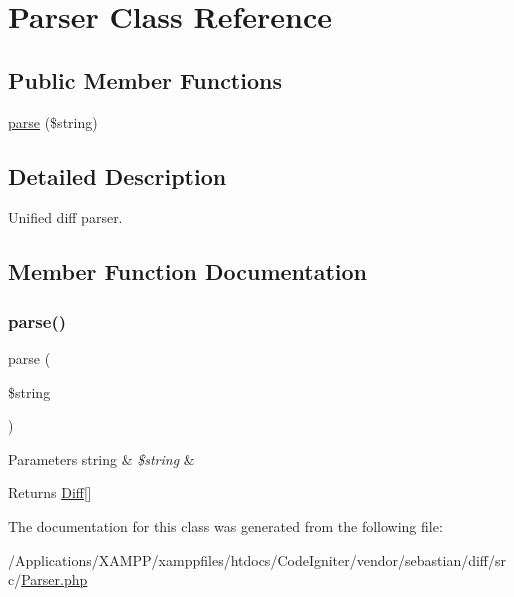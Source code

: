 \hypertarget{class_sebastian_bergmann_1_1_diff_1_1_parser}{}\section{Parser Class Reference}
\label{class_sebastian_bergmann_1_1_diff_1_1_parser}
\subsection*{Public Member Functions}
\begin{DoxyCompactItemize}
\item 
\mbox{\hyperlink{class_sebastian_bergmann_1_1_diff_1_1_parser_a8652be52c4455b8ce1a8e79fdb083703}{parse}} (\$string)
\end{DoxyCompactItemize}


\subsection{Detailed Description}
Unified diff parser. 

\subsection{Member Function Documentation}
\mbox{\label{class_sebastian_bergmann_1_1_diff_1_1_parser_a8652be52c4455b8ce1a8e79fdb083703}} 
\subsubsection{\texorpdfstring{parse()}{parse()}}
{\footnotesize\ttfamily parse (\begin{DoxyParamCaption}\item[{}]{\$string }\end{DoxyParamCaption})}


\begin{DoxyParams}[1]{Parameters}
string & {\em \$string} & \\
\hline
\end{DoxyParams}
\begin{DoxyReturn}{Returns}
\mbox{\hyperlink{class_sebastian_bergmann_1_1_diff_1_1_diff}{Diff}}\mbox{[}\mbox{]} 
\end{DoxyReturn}


The documentation for this class was generated from the following file\+:\begin{DoxyCompactItemize}
\item 
/\+Applications/\+X\+A\+M\+P\+P/xamppfiles/htdocs/\+Code\+Igniter/vendor/sebastian/diff/src/\mbox{\hyperlink{vendor_2sebastian_2diff_2src_2_parser_8php}{Parser.\+php}}\end{DoxyCompactItemize}
